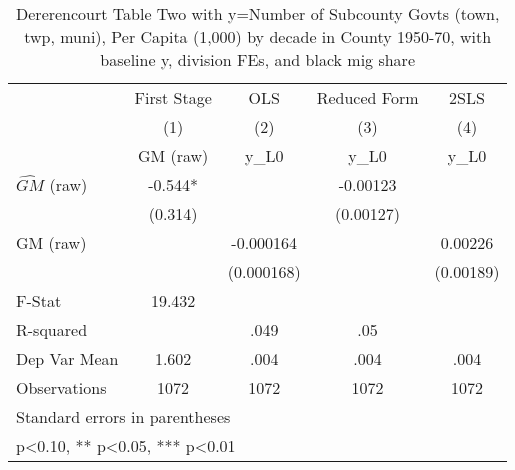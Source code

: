 \begin{table}[htbp]\centering
\def\sym#1{\ifmmode^{#1}\else\(^{#1}\)\fi}
\caption{Dererencourt Table Two with y=Number of Subcounty Govts (town, twp, muni), Per Capita (1,000) by decade in County 1950-70, with baseline y, division FEs, and black mig share}
\begin{tabular}{l*{4}{c}}
\toprule
                    & First Stage   &         OLS   &Reduced Form   &        2SLS   \\
                    &\multicolumn{1}{c}{(1)}&\multicolumn{1}{c}{(2)}&\multicolumn{1}{c}{(3)}&\multicolumn{1}{c}{(4)}\\
                    &\multicolumn{1}{c}{GM  (raw)}&\multicolumn{1}{c}{y\_L0}&\multicolumn{1}{c}{y\_L0}&\multicolumn{1}{c}{y\_L0}\\
\midrule
$\hat{GM}$ (raw)    &      -0.544*  &               &    -0.00123   &               \\
                    &     (0.314)   &               &   (0.00127)   &               \\
\addlinespace
GM  (raw)           &               &   -0.000164   &               &     0.00226   \\
                    &               &  (0.000168)   &               &   (0.00189)   \\
\midrule
F-Stat              &      19.432   &               &               &               \\
R-squared           &               &        .049   &         .05   &               \\
Dep Var Mean        &       1.602   &        .004   &        .004   &        .004   \\
Observations        &        1072   &        1072   &        1072   &        1072   \\
\bottomrule
\multicolumn{5}{l}{\footnotesize Standard errors in parentheses}\\
\multicolumn{5}{l}{\footnotesize * p<0.10, ** p<0.05, *** p<0.01}\\
\end{tabular}
\end{table}
